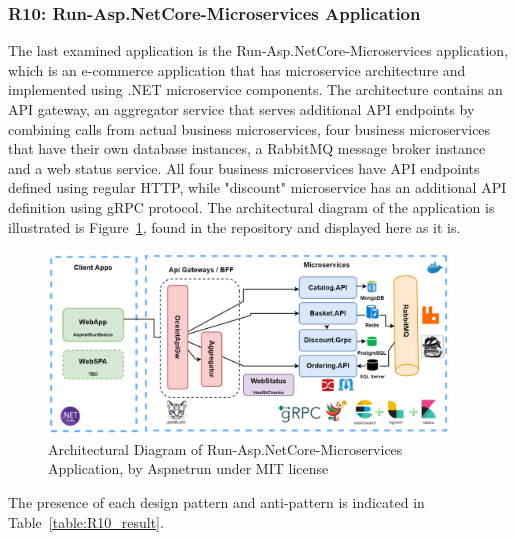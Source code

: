 \documentclass{Configuration_Files/PoliMi3i_thesis}
\begin{document}
\subsubsection{R10: Run-Asp.NetCore-Microservices Application}
\label{subsubsec:R10}

The last examined application is the Run-Asp.NetCore-Microservices application, which is an e-commerce application that has microservice architecture and implemented using .NET microservice components.
The architecture contains an API gateway, an aggregator service that serves additional API endpoints by combining calls from actual business microservices, four business microservices that have their own database instances, a RabbitMQ message broker instance and a web status service.
All four business microservices have API endpoints defined using regular HTTP, while "discount" microservice has an additional API definition using gRPC protocol.
The architectural diagram of the application is illustrated is Figure~\ref{fig:R10_arch}, found in the repository and displayed here as it is.

\begin{figure}[H]
\centering
\includegraphics[width=0.95\textwidth]{myImages/R10.png}
\caption{Architectural Diagram of Run-Asp.NetCore-Microservices Application, by Aspnetrun under MIT license}
\label{fig:R10_arch}
\end{figure}

The presence of each design pattern and anti-pattern is indicated in Table~\ref{table:R10_result}.
\end{document}

